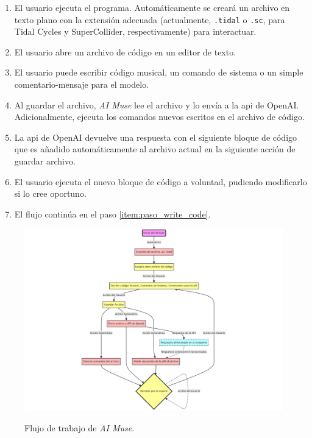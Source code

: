 \begin{enumerate}
    \item El usuario ejecuta el programa. Automáticamente se creará un archivo en texto plano con la extensión adecuada (actualmente, \texttt{.tidal} o \texttt{.sc}, para Tidal Cycles y SuperCollider, respectivamente) para interactuar.
    \item El usuario abre un archivo de código en un editor de texto.
    \item \label{item:paso_write_code} El usuario puede escribir código musical, un comando de sistema o un simple comentario-mensaje para el modelo.
    \item Al guardar el archivo, \emph{AI Muse} lee el archivo y lo envía a la \gls{api} de OpenAI. Adicionalmente, ejecuta los comandos nuevos escritos en el archivo de código.
    \item La \gls{api} de OpenAI devuelve una respuesta con el siguiente bloque de código que es añadido automáticamente al archivo actual en la siguiente acción de guardar archivo.
    \item El usuario ejecuta el nuevo bloque de código a voluntad, pudiendo modificarlo si lo cree oportuno.
    \item El flujo continúa en el paso \ref{item:paso_write_code}.
\end{enumerate}


\begin{figure}[H]
    \caption[Flujo de trabajo de \emph{AI Muse}]{Flujo de trabajo de \emph{AI Muse}.}
    \centering
    \includegraphics[width=1\textwidth]{./figuras/flujo_aimuse.png}
    \source{\propio}
    \label{fig:ai_muse_flow}
\end{figure}


